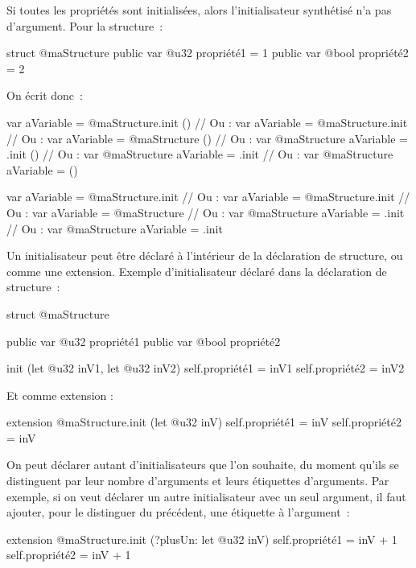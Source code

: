 Si toutes les propriétés sont initialisées, alors l'initialisateur synthétisé n'a pas d'argument. Pour la structure~:
\begin{galgas4}
struct @maStructure {
  public var @u32 propriété1 = 1
  public var @bool propriété2 = 2
}
\end{galgas4}

On écrit donc~:
\begin{galgas4}
var aVariable = @maStructure.init ()
// Ou :
var aVariable = @maStructure.init
// Ou :
var aVariable = @maStructure ()
// Ou :
var @maStructure aVariable = .init ()
// Ou :
var @maStructure aVariable = .init
// Ou :
var @maStructure aVariable = ()
\end{galgas4}
\begin{galgas4}
var aVariable = @maStructure.init {}
// Ou :
var aVariable = @maStructure.init
// Ou :
var aVariable = @maStructure {}
// Ou :
var @maStructure aVariable = .init {}
// Ou :
var @maStructure aVariable = .init
\end{galgas4}








Un initialisateur peut être déclaré à l'intérieur de la déclaration de structure, ou comme une extension. Exemple d'initialisateur déclaré dans la déclaration de structure~:

\begin{galgas4}
struct @maStructure {
  public var @u32 propriété1
  public var @bool propriété2

  init (let @u32 inV1, let @u32 inV2) {
    self.propriété1 = inV1
    self.propriété2 = inV2
  }
}
\end{galgas4}

Et comme extension :

\begin{galgas4}
extension @maStructure.init (let @u32 inV) {
  self.propriété1 = inV
  self.propriété2 = inV
}
\end{galgas4}

On peut déclarer autant d'initialisateurs que l'on souhaite, du moment qu'ils se distinguent par leur nombre d'arguments et leurs étiquettes d'arguments. Par exemple, si on veut déclarer un autre initialisateur avec un seul argument, il faut ajouter, pour le distinguer du précédent, une étiquette à l'argument~:
\begin{galgas4}
extension @maStructure.init (?plusUn: let @u32 inV) {
  self.propriété1 = inV + 1
  self.propriété2 = inV + 1
}
\end{galgas4}


